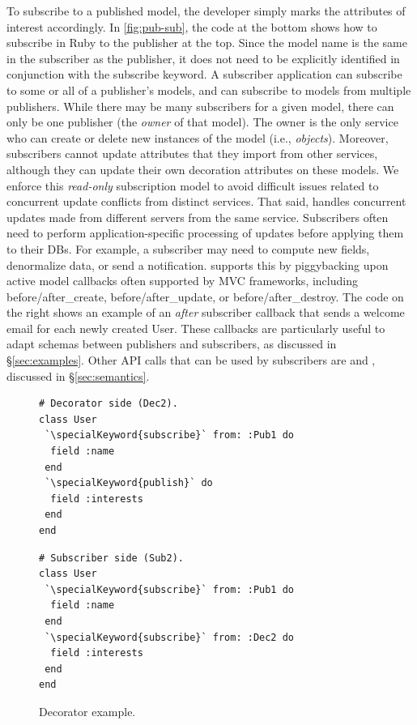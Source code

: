 To subscribe to a published model, the developer simply marks the attributes of
interest accordingly.  In \F\ref{fig:pub-sub}, the code at the bottom
shows how to subscribe in Ruby to the publisher at the top.  Since
the model name is the same in the subscriber as the publisher, it does not
need to be explicitly identified in conjunction with the 
{\code subscribe} keyword. 
A subscriber application can subscribe to some or all of a publisher's
models, and can subscribe to models from multiple publishers. While
there may be many subscribers for a given model, there can only be one
publisher (the {\em owner} of that model). The owner is the only
service who can create or delete new instances of the model (i.e.,
{\em objects}). Moreover, subscribers cannot update attributes that they
import from other services, although they can update their own
decoration attributes on these models. We enforce this {\em read-only}
subscription model to avoid difficult issues related to concurrent update
conflicts from distinct services.
That said, \synapse handles concurrent updates made from different
servers from the same service.
Subscribers often need to perform
application-specific processing of updates before applying them to their
DBs. For example, a subscriber may need to compute new fields,
denormalize data, or send a notification.  \synapse supports this by
piggybacking upon active model callbacks often supported by MVC frameworks,
including {\code \small before/after\_create}, {\code \small before/after\_update}, or
{\code \small  before/after\_destroy}.
The code on the right shows an example of an \emph{after} subscriber callback that
sends a welcome email for each newly created User.
These callbacks are particularly useful to adapt schemas
between publishers and subscribers, as discussed in
\S\ref{sec:examples}. 
Other API calls that can be used by subscribers are {}
and {}, discussed in \S\ref{sec:semantics}.

\begin{figure}
\centering
\begin{minipage}{.8\textwidth}
\begin{minipage}{.4\textwidth}
\begin{lstlisting}[framexleftmargin=5pt]
# Decorator side (Dec2).
class User
 `\specialKeyword{subscribe}` from: :Pub1 do
  field :name
 end
 `\specialKeyword{publish}` do
  field :interests
 end
end
\end{lstlisting}
\end{minipage}
\hspace{1.2in}
\begin{minipage}{.4\textwidth}
\begin{lstlisting}[framexleftmargin=5pt]
# Subscriber side (Sub2).
class User
 `\specialKeyword{subscribe}` from: :Pub1 do
  field :name
 end
 `\specialKeyword{subscribe}` from: :Dec2 do
  field :interests
 end
end
\end{lstlisting}
\end{minipage}
\end{minipage}
\caption{Decorator example.}
\label{fig:deco}
\end{figure}

